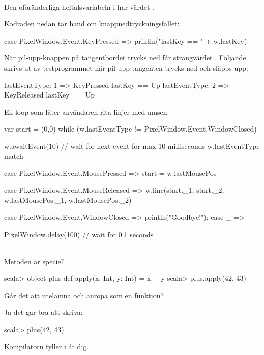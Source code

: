 \TaskSolved \what~

\SubtaskSolved Den oföränderliga heltalsvariabeln  i  har värdet .

\SubtaskSolved Kodraden nedan tar hand om knappnedtryckningsfallet:
\begin{Code}
case PixelWindow.Event.KeyPressed => println("lastKey == " + w.lastKey)
\end{Code}

\SubtaskSolved När pil-upp-knappen på tangentbordet trycks ned får  strängvärdet . Följande skrivs ut av testprogrammet när pil-upp-tangenten trycks ned och släpps upp:
\begin{REPL}
lastEventType: 1 => KeyPressed
lastKey == Up
lastEventType: 2 => KeyReleased
lastKey == Up
\end{REPL}


\SubtaskSolved En loop som låter användaren rita linjer med musen:
\begin{Code}
var start = (0,0)
while (w.lastEventType != PixelWindow.Event.WindowClosed) {
  w.awaitEvent(10)  // wait for next event for max 10 milliseconds
  w.lastEventType match {
    case PixelWindow.Event.MousePressed  =>
      start = w.lastMousePos

    case PixelWindow.Event.MouseReleased =>
      w.line(start._1, start._2, w.lastMousePos._1, w.lastMousePos._2)

    case PixelWindow.Event.WindowClosed  =>
       println("Goodbye!");
    case _ =>
  }
  PixelWindow.delay(100) // wait for 0.1 seconds
}
\end{Code}

\QUESTEND


\clearpage

\ExtraTasks %


\QUESTBEGIN

\Task  \what~ \\
Metoden  är speciell.
\begin{REPL}
scala> object plus { def apply(x: Int, y: Int) = x + y }
scala> plus.apply(42, 43)
\end{REPL}
Går det att utelämna  och anropa  som en funktion?

\SOLUTION

\TaskSolved \what
Ja det går bra att skriva:
\begin{REPL}
scala> plus(42, 43)
\end{REPL}
Kompilatorn fyller i  åt dig.
\QUESTEND


